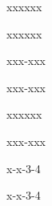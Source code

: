     \startTEXpage[offset=1ts]
    {xxx\-xxx\par}
    { xxx\-xxx\par}
    {xxx-xxx\par}
    { xxx-xxx\par}
    { xxxxxx\par}
    { xxx-xxx\par}
    x-x-3-4\par
    \setupalign[nothyphenated]
    x-x-3-4\par
\stopTEXpage
